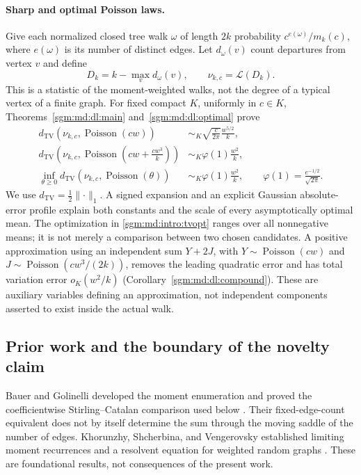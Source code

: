 \documentclass[11pt,letterpaper]{article}
\theoremstyle{remark}\newtheorem{remark}[theorem]{Remark}
\newcommand{\Poi}{\operatorname{Poisson}}\newcommand{\Bin}{\operatorname{Bin}}
\theoremstyle{definition}\newtheorem{definition}[theorem]{Definition}
\newcommand{\TV}{d_{\mathrm{TV}}}
\begin{document}
\paragraph{Sharp and optimal Poisson laws.}
Give each normalized closed tree walk $\omega$ of length $2k$
probability $c^{e(\omega)}/m_k(c)$, where $e(\omega)$ is its number
of distinct edges. Let $d_\omega(v)$ count departures from vertex $v$
and define
\begin{equation}\label{sgm:md:intro:deficit}
 D_k=k-\max_v d_\omega(v),\qquad \nu_{k,c}=\mathcal L(D_k).
\end{equation}
This is a statistic of the moment-weighted walks, not the degree of a
typical vertex of a finite graph. For fixed compact $K$, uniformly in
$c\in K$, Theorems~\ref{sgm:md:dl:main} and~\ref{sgm:md:dl:optimal} prove
\begin{align}
 \TV(\nu_{k,c},\Poi(cw))
 &\sim_K\sqrt{\frac{c}{2\pi}}\frac{w^{5/2}}{k},
 \label{sgm:md:intro:tv0}\\
 \TV\!\left(\nu_{k,c},\Poi\!\left(cw+\frac{cw^3}{k}\right)\right)
 &\sim_K\varphi(1)\frac{w^2}{k},\label{sgm:md:intro:tv1}\\
 \inf_{\theta\ge0}\TV(\nu_{k,c},\Poi(\theta))
 &\sim_K\varphi(1)\frac{w^2}{k},
 \qquad \varphi(1)=\frac{e^{-1/2}}{\sqrt{2\pi}}.
 \label{sgm:md:intro:tvopt}
\end{align}
We use $\TV=\tfrac12\lVert\cdot\rVert_1$. A signed expansion and an
explicit Gaussian absolute-error profile explain both constants and
the scale of every asymptotically optimal mean. The optimization in
\eqref{sgm:md:intro:tvopt} ranges over all nonnegative means; it is not merely
a comparison between two chosen candidates. A positive approximation
using an independent sum $Y+2J$, with
$Y\sim\Poi(cw)$ and $J\sim\Poi(cw^3/(2k))$, removes the leading
quadratic error and has total variation error $o_K(w^2/k)$
(Corollary~\ref{sgm:md:dl:compound}). These are auxiliary variables defining
an approximation, not independent components asserted to exist
inside the actual walk.

\subsection{Prior work and the boundary of the novelty claim}

Bauer and Golinelli developed the moment enumeration and proved the
coefficientwise Stirling--Catalan comparison used below
\cite[Section 5.5, equation (9)]{bg}.
Their fixed-edge-count equivalent does not by itself determine the sum
through the moving saddle of the number of edges. Khorunzhy,
Shcherbina, and Vengerovsky established limiting moment recurrences and
a resolvent equation for weighted random graphs
\cite{Khorunzhy2004}. These are foundational results, not consequences
of the present work.
\end{document}
